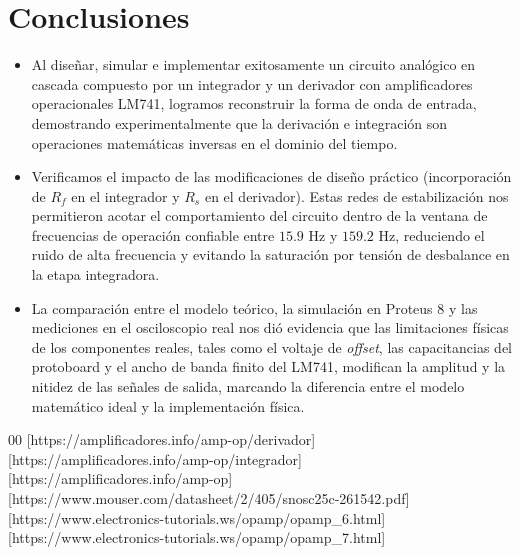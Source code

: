 \documentclass[conference]{IEEEtran}
\begin{document}
\section{Conclusiones}

\begin{itemize}
    \item Al diseñar, simular e implementar exitosamente un circuito analógico en cascada compuesto por un integrador y un derivador con amplificadores operacionales LM741, logramos reconstruir la forma de onda de entrada, demostrando experimentalmente que la derivación e integración son operaciones matemáticas inversas en el dominio del tiempo.
    \item Verificamos el impacto de las modificaciones de diseño práctico (incorporación de $R_f$ en el integrador y $R_s$ en el derivador). Estas redes de estabilización nos permitieron acotar el comportamiento del circuito dentro de la ventana de frecuencias de operación confiable entre $15.9\text{ Hz}$ y $159.2\text{ Hz}$, reduciendo el ruido de alta frecuencia y evitando la saturación por tensión de desbalance en la etapa integradora.
    \item La comparación entre el modelo teórico, la simulación en Proteus 8 y las mediciones en el osciloscopio real nos dió evidencia que las limitaciones físicas de los componentes reales, tales como el voltaje de \textit{offset}, las capacitancias del protoboard y el ancho de banda finito del LM741, modifican la amplitud y la nitidez de las señales de salida, marcando la diferencia entre el modelo matemático ideal y la implementación física.
\end{itemize}

\begin{thebibliography}{00}
 [https://amplificadores.info/amp-op/derivador]
 [https://amplificadores.info/amp-op/integrador]
 [https://amplificadores.info/amp-op]
 [https://www.mouser.com/datasheet/2/405/snosc25c-261542.pdf]
 [https://www.electronics-tutorials.ws/opamp/opamp_6.html]
 [https://www.electronics-tutorials.ws/opamp/opamp_7.html]
\end{thebibliography}
\end{document}
